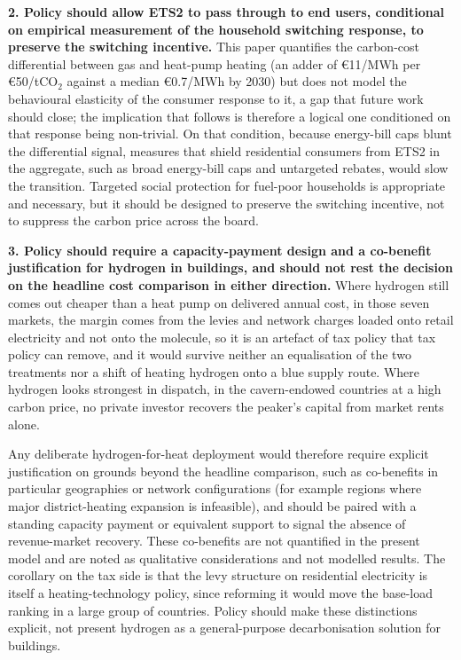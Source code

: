 \textbf{2. Policy should allow ETS2 to pass through to end users, conditional on
empirical measurement of the household switching response, to preserve the
switching incentive.} This paper quantifies the carbon-cost differential between
gas and heat-pump heating (an adder of \euro{}11/MWh per \euro{}50/tCO$_2$ against a median \euro{}0.7/MWh by
2030) but does not model the behavioural elasticity of the consumer response to
it, a gap that future work should close; the implication that follows is therefore
a logical one conditioned on that response being non-trivial. On that condition,
because energy-bill caps blunt the differential signal, measures that shield
residential consumers from ETS2 in the aggregate, such as broad energy-bill caps
and untargeted rebates, would slow the transition. Targeted social protection for
fuel-poor households is appropriate and necessary, but it should be designed to
preserve the switching incentive, not to suppress the carbon price across
the board.

\textbf{3. Policy should require a capacity-payment design and a co-benefit
justification for hydrogen in buildings, and should not rest the decision on the
headline cost comparison in either direction.} Where hydrogen still comes out cheaper
than a heat pump on delivered annual cost, in those seven markets, the margin comes from
the levies and network charges loaded onto retail electricity and not onto the molecule,
so it is an artefact of tax policy that tax policy can remove, and it would survive
neither an equalisation of the two treatments nor a shift of heating hydrogen onto a
blue supply route. Where hydrogen looks strongest in dispatch, in the cavern-endowed
countries at a high carbon price, no private investor recovers the peaker's capital from
market rents alone.

Any deliberate hydrogen-for-heat deployment would therefore require explicit
justification on grounds beyond the headline comparison, such as co-benefits in
particular geographies or network configurations (for example regions where major
district-heating expansion is infeasible), and should be paired with a standing capacity
payment or equivalent support to signal the absence of revenue-market recovery. These
co-benefits are not quantified in the present model and are noted as qualitative
considerations and not modelled results. The corollary on the tax side is that the levy
structure on residential electricity is itself a heating-technology policy, since
reforming it would move the base-load ranking in a large group of countries. Policy
should make these distinctions explicit, not present hydrogen as a general-purpose
decarbonisation solution for buildings.

